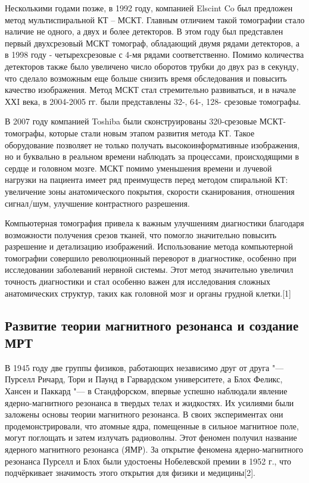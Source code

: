 Несколькими годами позже, в 1992 году, компанией Elscint Co был предложен метод мультиспиральной КТ – МСКТ. Главным отличием такой томографии стало наличие не одного, а двух и более детекторов. В этом году был представлен первый двухсрезовый МСКТ томограф, обладающий двумя рядами детекторов, а в 1998 году - четырехсрезовые с 4-мя рядами соответственно. Помимо количества детекторов также было увеличено число оборотов трубки до двух раз в секунду, что сделало возможным еще больше снизить время обследования и повысить качество изображения. Метод МСКТ стал стремительно развиваться, и в начале ХХI века, в 2004-2005 гг. были представлены 32-, 64-, 128- срезовые томографы. 

В 2007 году компанией Toshiba были сконструированы 320-срезовые МСКТ-томографы, которые стали новым этапом развития метода КТ. Такое оборудование позволяет не только получать высокоинформативные изображения, но и буквально в реальном времени наблюдать за процессами, происходящими в сердце и головном мозге. МСКТ помимо уменьшения времени и лучевой нагрузки на пациента имеет ряд преимуществ перед методом спиральной КТ: увеличение зоны анатомического покрытия, скорости сканирования, отношения сигнал/шум, улучшение контрастного разрешения. 

 Компьютерная томография привела к важным улучшениям диагностики благодаря возможности получения срезов тканей, что помогло значительно повысить разрешение и детализацию изображений. Использование метода компьютерной томографии совершило революционный переворот в диагностике, особенно при исследовании заболеваний нервной системы.  Этот метод значительно увеличил точность диагностики и стал особенно важен для исследования сложных анатомических структур, таких как головной мозг и органы грудной клетки.[1]

 \subsection{Развитие теории магнитного резонанса и создание МРТ}

В 1945 году две группы физиков, работающих независимо друг от друга "--- Пурселл Ричард, Тори и Паунд в Гарвардском университете, а Блох Феликс, Хансен и Паккард "--- в Стандфорском, впервые успешно наблюдали явление ядерно-магнитного резонанса в твердых телах и жидкостях.  Их усилиями были заложены основы теории магнитного резонанса. В своих экспериментах они продемонстрировали, что атомные ядра, помещенные в сильное магнитное поле, могут поглощать и затем излучать радиоволны. Этот феномен получил название ядерного магнитного резонанса (ЯМР). За открытие феномена ядерно-магнитного резонанса Пурселл и Блох были удостоены Нобелевской премии в 1952 г., что подчёркивает значимость этого открытия для физики и медицины[2].

